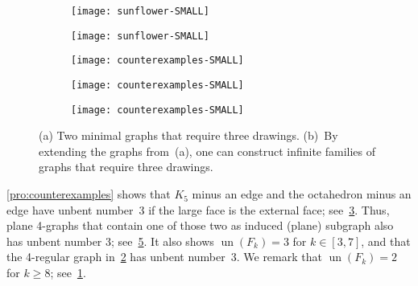\documentclass[runningheads]{llncs}
\newcommand\lip[1]{}
\newcommand{\un}{\operatorname{un}}
\begin{document}
\begin{figure}[t]
\begin{minipage}[b]{.57\textwidth}
  \begin{subfigure}{.32\textwidth}
    \centering
    \texttt{[image: sunflower-SMALL]}
    \subcaption{\lip{\nolinenumbers{}}}
  \end{subfigure}
  \hfill
  \begin{subfigure}{.32\textwidth}
    \centering
    \texttt{[image: sunflower-SMALL]}
    \subcaption{\lip{\nolinenumbers{}}}
    \label{fig:8sunflower}
  \end{subfigure}
  \hfill
  \begin{subfigure}{.32\textwidth}
    \centering    
    \texttt{[image: counterexamples-SMALL]}
    \subcaption{\lip{\nolinenumbers{}}} 
    \label{fig:counterexample2}
  \end{subfigure}

  \caption{(a), (b) Flower graphs $F_3$ %
    and $F_8$ with 3 %
    and 8 petals, respectively.
    Note that $\un(F_3) = 3$%
    , whereas $\un(F_8)=2$.
    The 2-edge-coloring shown for $F_8$ is balanced;
    see the demands (the numbers inside the faces).
    (d)~Another 4-regular graph~$G$ with $\un(G)=3$.
    }
    \label{fig:sunflowers}
\end{minipage}
\hfill
\begin{minipage}[b]{.39\textwidth}
  \begin{subfigure}[b]{.49\textwidth}
    \centering
    \texttt{[image: counterexamples-SMALL]}
    \subcaption{}
    \label{fig:minimalCounterexamples}
  \end{subfigure}
  \hfill
  \begin{subfigure}[b]{.49\textwidth}
    \centering
    \texttt{[image: counterexamples-SMALL]}
    \subcaption{}
    \label{fig:infiniteCounterexamples}
  \end{subfigure}
  \caption{(a) Two minimal graphs that require three drawings. (b)~By extending the graphs from~(a), one can construct infinite families of graphs that require three drawings.}
\end{minipage}
\end{figure}


\cref{pro:counterexamples} shows that $K_5$ minus an edge and the octahedron minus an edge have unbent number~3 if the large face is the external face; see~\cref{fig:minimalCounterexamples}.
Thus, plane 4-graphs that contain one of those two as induced (plane) subgraph also has unbent number 3;
see~\cref{fig:infiniteCounterexamples}.
It also shows $\un(F_k)=3$ for $k \in [3, 7]$,
and that the 4-regular graph in~\cref{fig:counterexample2}
has unbent number~3.
We remark that $\un(F_k)=2$ for $k \ge 8$; see~\cref{fig:8sunflower}.%
\end{document}
